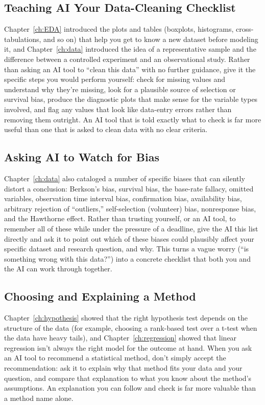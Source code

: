 \subsection{Teaching AI Your Data-Cleaning Checklist}

Chapter~\ref{ch:EDA} introduced the plots and tables (boxplots, histograms,
cross-tabulations, and so on) that help you get to know a new dataset before
modeling it, and Chapter~\ref{ch:data} introduced the idea of a representative
sample and the difference between a controlled experiment and an observational
study. Rather than asking
an AI tool to ``clean this data'' with no further guidance, give it the
specific steps you would perform yourself: check for missing values
and understand why they're missing, look for a plausible source of
selection or survival bias, produce the diagnostic plots that make
sense for the variable types involved, and flag any values that look
like data-entry errors rather than removing them outright. An AI tool
that is told exactly what to check is far more useful than one that is
asked to clean data with no clear criteria.

\subsection{Asking AI to Watch for Bias}

Chapter~\ref{ch:data} also cataloged a number of specific biases that
can silently distort a conclusion: Berkson's bias, survival bias, the
base-rate fallacy, omitted variables, observation time interval bias,
confirmation bias, availability bias, arbitrary rejection of
``outliers,'' self-selection (volunteer) bias, nonresponse bias, and
the Hawthorne effect. Rather than trusting yourself, or an AI tool, to
remember all of these while under the pressure of a deadline, give the
AI this list directly and ask it to point out which of these biases
could plausibly affect your specific dataset and research question,
and why. This turns a vague worry (``is something wrong with this
data?'') into a concrete checklist that both you and the AI can work
through together.

\subsection{Choosing and Explaining a Method}

Chapter~\ref{ch:hypothesis} showed that the right hypothesis test
depends on the structure of the data (for example, choosing a
rank-based test over a t-test when the data have heavy tails), and
Chapter~\ref{ch:regression} showed that linear regression isn't
always the right model for the outcome at hand. When you ask an AI
tool to recommend a statistical method, don't simply accept the
recommendation: ask it to explain why that method fits your data and
your question, and compare that explanation to what you know about the
method's assumptions. An explanation you can follow and check is far
more valuable than a method name alone.

